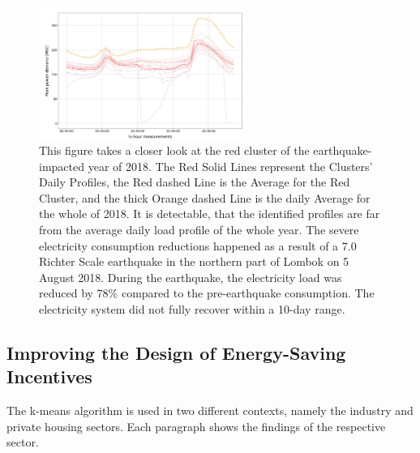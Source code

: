 \begin{figure}[H]
    \centering
    \includegraphics[width=0.6\textwidth]{figures/jessen_ndImpactedClusters/jessen_ClusterTwo2018.png}
    \caption{This figure takes a closer look at the red cluster of the earthquake-impacted year of 2018.
    The Red Solid Lines represent the Clusters' Daily Profiles, the Red dashed Line is the Average for the Red Cluster, and the thick Orange dashed Line is the daily Average for the whole of 2018.
    It is detectable, that the identified profiles are far from the average daily load profile of the whole year.
    The severe electricity consumption reductions happened as a result of a 7.0 Richter Scale earthquake in the northern part of Lombok on 5 August 2018.
    During the earthquake, the electricity load was reduced by 78\% compared to the pre-earthquake consumption.
    The electricity system did not fully recover within a 10-day range.
    }
    \label{fig:clustering_results_2018_cluster_two}
\end{figure}

\subsection{Improving the Design of Energy-Saving Incentives}
\label{sec:improving_the_design_of_energy_saving_incentives}
The k-means algorithm is used in two different contexts, namely the industry and private housing sectors.
Each paragraph shows the findings of the respective sector.

